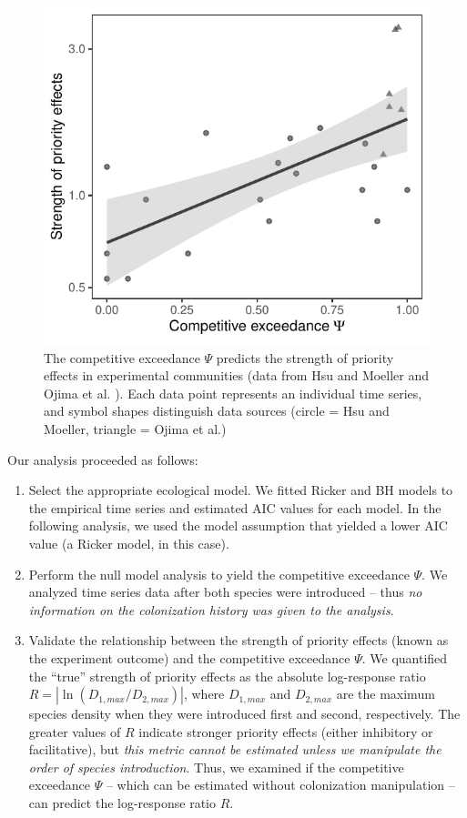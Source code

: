 \documentclass[12pt, class=article, crop=false]{standalone}
\begin{document}
\begin{figure}
    \includegraphics[scale=0.6]{output/figure_exp.pdf}
    \caption{The competitive exceedance $\Psi$ predicts the strength of priority effects in experimental communities (data from Hsu and Moeller \citep{hsu_metabolic_2021} and Ojima et al. \citep{ojima_priority_2022}).
    Each data point represents an individual time series, and symbol shapes distinguish data sources (circle = Hsu and Moeller, triangle = Ojima et al.)}
    \label{fig:experiment}
\end{figure}

Our analysis proceeded as follows:

\begin{enumerate}
    \item Select the appropriate ecological model.
    We fitted Ricker and BH models to the empirical time series and estimated AIC values for each model.
    In the following analysis, we used the model assumption that yielded a lower AIC value (a Ricker model, in this case).
    \item Perform the null model analysis to yield the competitive exceedance $\Psi$.
    We analyzed time series data after both species were introduced -- thus \textit{no information on the colonization history was given to the analysis}.
    \item Validate the relationship between the strength of priority effects (known as the experiment outcome) and the competitive exceedance $\Psi$.
    We quantified the ``true'' strength of priority effects as the absolute log-response ratio $R = |\ln (D_{1, max} / D_{2, max})|$, where $D_{1, max}$ and $D_{2, max}$ are the maximum species density when they were introduced first and second, respectively.
    The greater values of $R$ indicate stronger priority effects (either inhibitory or facilitative), but \textit{this metric cannot be estimated unless we manipulate the order of species introduction}.
    Thus, we examined if the competitive exceedance $\Psi$ -- which can be estimated without colonization manipulation -- can predict the log-response ratio $R$.
\end{enumerate}
\end{document}
